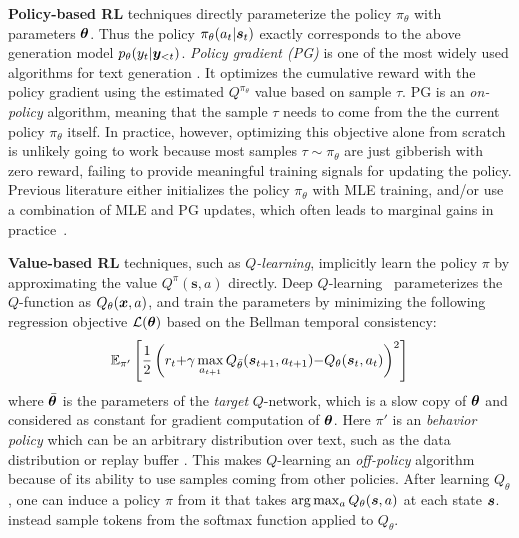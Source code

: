 \noindent\textbf{Policy-based RL}
techniques directly parameterize the policy $\pi_{\theta}$ with parameters $\bm{\theta}$. Thus the policy $\pi_{\theta}(a_t | \bm{s}_t)$ exactly corresponds to the above generation model $p_{\theta}(y_t | \bm{y}_{<t})$. 
\emph{Policy gradient (PG)} is one of the most widely used algorithms for text generation \citep{ranzato2015sequence}.
It optimizes the cumulative reward with the policy gradient using the estimated $Q^{\pi_\theta}$ value based on sample $\tau$. PG is an \textit{on-policy} algorithm, meaning that the sample $\tau$ needs to come from the the current policy $\pi_\theta$ itself.
In practice, however, optimizing this objective alone from scratch is unlikely going to work because most samples $\tau\sim\pi_\theta$ are just gibberish with zero reward, failing to provide meaningful training signals for updating the policy. 
Previous literature either initializes the policy $\pi_{{\theta}}$ with MLE training, and/or use a combination of MLE and PG updates, which often leads to marginal gains in practice~\citep{wu2018study,Choshen2020On}. 



\noindent\textbf{Value-based RL}
techniques, such as \emph{$Q$-learning}, implicitly learn the policy $\pi$ by approximating the value $Q^{\pi}(\bm{s}, a)$ directly.
Deep $Q$-learning~\citep{mnih2013playing} parameterizes the $Q$-function as $Q_\theta(\bm{x},a)$, and train the parameters by minimizing the following regression objective $\mathcal{L}(\bm{\theta})$ based on the Bellman temporal consistency:
\begin{equation}
\small
    {\E}_{\pi'}\left[ \frac{1}{2} \left( r_t {+} \gamma \max_{a_{t+1}} Q_{\bar{\theta}}(\s_{t+1}, a_{t+1}) {-} Q_{\theta}(\s_t, a_t) \right)^2 \right]%
\label{eq:q-regression}
\end{equation}
where $\bar{\bm{\theta}}$ is the parameters of the \emph{target} $Q$-network, which is a slow copy of $\bm{\theta}$ and considered as constant for gradient computation of $\bm{\theta}$. 
Here $\pi'$ is an \emph{behavior policy} which can be an arbitrary distribution over text, such as the data distribution or replay buffer \citep{mnih2013playing}. 
This makes $Q$-learning an \textit{off-policy} algorithm because of its ability to use samples coming from other policies. After learning $Q_\theta$, one can induce a policy $\pi$ from it that takes $\arg\max_{a} Q_\theta(\bm{s}, a)$ at each state $\bm{s}$.
\citet{jaques2017sequence} instead sample tokens from the softmax function applied to $Q_\theta$.

